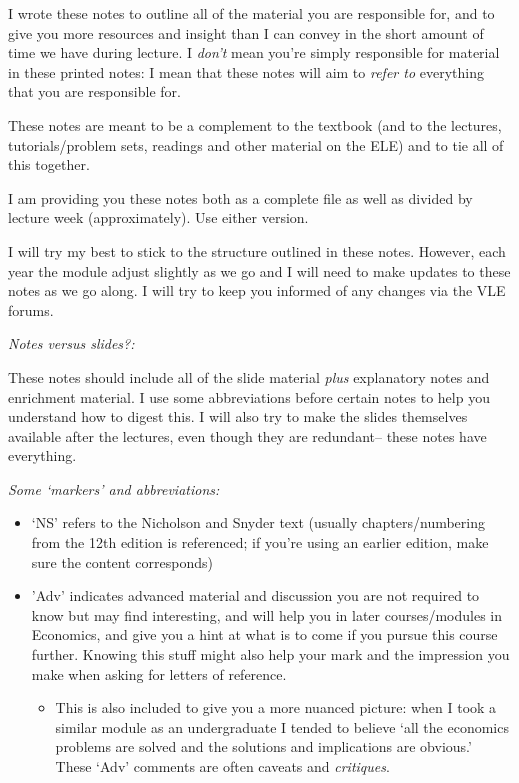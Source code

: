 \documentclass[]{article}
\providecommand{\tightlist}{%
  \setlength{\itemsep}{0pt}\setlength{\parskip}{0pt}}
\begin{document}
I wrote these notes to outline all of the material you are responsible
for, and to give you more resources and insight than I can convey in the
short amount of time we have during lecture. I \emph{don't} mean you're
simply responsible for material in these printed notes: I mean that
these notes will aim to \emph{refer to} everything that you are
responsible for.

These notes are meant to be a complement to the textbook (and to the
lectures, tutorials/problem sets, readings and other material on the
ELE) and to tie all of this together.

I am providing you these notes both as a complete file as well as
divided by lecture week (approximately). Use either version.

I will try my best to stick to the structure outlined in these notes.
However, each year the module adjust slightly as we go and I will need
to make updates to these notes as we go along. I will try to keep you
informed of any changes via the VLE forums.

\bigskip

\emph{Notes versus slides?:}

These notes should include all of the slide material \emph{plus}
explanatory notes and enrichment material. I use some abbreviations
before certain notes to help you understand how to digest this. I will
also try to make the slides themselves available after the lectures,
even though they are redundant-- these notes have everything.

\bigskip

\emph{Some `markers' and abbreviations:}

\begin{itemize}
\tightlist
\item
  `NS' refers to the Nicholson and Snyder text (usually
  chapters/numbering from the 12th edition is referenced; if you're
  using an earlier edition, make sure the content corresponds)
\end{itemize}

\begin{itemize}
\tightlist
\item
  \textcolor{RawSienna}{'Adv'} indicates advanced material and
  discussion you are not required to know but may find interesting, and
  will help you in later courses/modules in Economics, and give you a
  hint at what is to come if you pursue this course further. Knowing
  this stuff might also help your mark and the impression you make when
  asking for letters of reference.

  \begin{itemize}
  \tightlist
  \item
    This is also included to give you a more nuanced picture: when I
    took a similar module as an undergraduate I tended to believe `all
    the economics problems are solved and the solutions and implications
    are obvious.' These `Adv' comments are often caveats and
    \emph{critiques}.
  \end{itemize}
\end{itemize}
\end{document}

